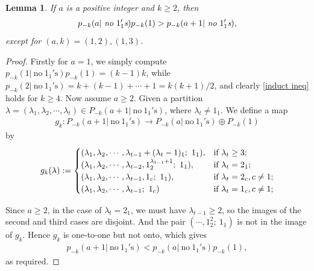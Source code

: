 \documentclass[12pt,reqno]{amsart}
\numberwithin{equation}{section}
\theoremstyle{plain}
\newtheorem{lemma}[theorem]{Lemma}
\theoremstyle{definition}
\begin{document}
\begin{lemma}\label{lemma1}
If $a$ is a positive integer and $k\geq2$, then
\begin{align}\label{induct ineq}
p_{-k}(a|~\emph{no}~1_{1}'\emph{s})p_{-k}(1) >p_{-k}(a+1|~\emph{no}~1_{1}'\emph{s}),
\end{align}
except for $(a,k)=(1,2), (1,3)$.
\end{lemma}

\begin{proof}
Firstly for $a=1$, we simply compute $p_{-k}(1|~\text{no}~1_{1}'\text{s})p_{-k}(1)=(k-1)k$, while $p_{-k}(2|~\text{no}~1_{1}'\text{s})=k+(k-1)+\cdots+1=k(k+1)/2$, and clearly \eqref{induct ineq} holds for $k\ge 4$. Now assume $a\ge 2$.
Given a partition $\lambda=(\lambda_{1},\lambda_{2},\cdots,\lambda_{t})\in P_{-k}(a+1|~\text{no}~1_{1}'\text{s})$, where $\lambda_{t}\neq1_{1}$. We define a map
\begin{align*}
g_{k}: P_{-k}(a+1|~\textrm{no}~1_{1}'\textrm{s})\rightarrow P_{-k}(a|~\textrm{no}~1_{1}'\textrm{s})\oplus P_{-k}(1)
\end{align*}
by
\begin{align*}
g_{k}(\lambda):=
\begin{cases}
(\lambda_{1},\lambda_{2},\cdots,\lambda_{t-1}+(\lambda_{t}-1)_1;~1_{1}), &\textrm{if}~\lambda_{t}\geq3; \cr(\lambda_{1},\lambda_{2},\cdots,\lambda_{t-2},1_{2}^{\lambda_{t-1}+1};~1_{1}), &\textrm{if}~\lambda_{t}=2_{1}; \cr (\lambda_{1},\lambda_{2},\cdots,\lambda_{t-1},1_{c};~1_{1}), &\textrm{if}~\lambda_{t}=2_{c}, c\neq1; \cr (\lambda_{1},\lambda_{2},\cdots,\lambda_{t-1};~1_{c}) &\textrm{if}~\lambda_{t}=1_{c}, c\neq1;
\end{cases}
\end{align*}

Since $a\ge 2$, in the case of $\lambda_t=2_1$, we must have $\lambda_{t-1}\ge 2$, so the images of the second and third cases are disjoint. And the pair $(\cdots, 1_2^2;~ 1_1)$ is not in the image of $g_k$. Hence $g_{k}$ is one-to-one but not onto, which gives
\begin{align*}
p_{-k}(a+1|~\textrm{no}~1_{1}'\textrm{s})< p_{-k}(a|~\textrm{no}~1_{1}'\textrm{s})p_{-k}(1),
\end{align*}
as required.
\end{proof}
\end{document}
